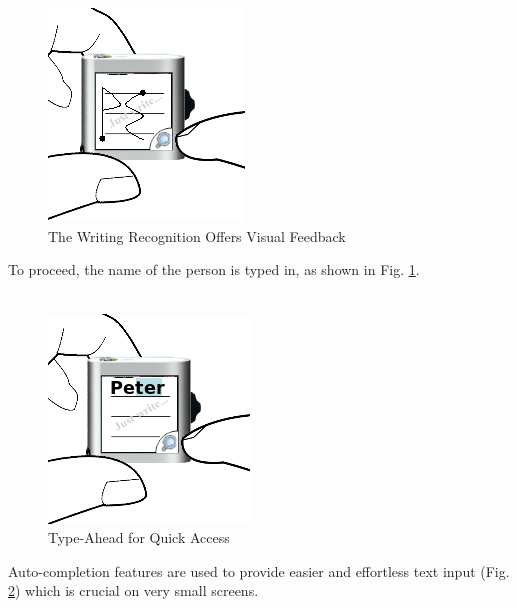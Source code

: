 \\
\\
%
\begin{figure}[h]
  \begin{center}
    \includegraphics[width=0.6\linewidth]{imgs/wt2.png}
  \end{center}
  \caption{The Writing Recognition Offers Visual Feedback}
  \label{fig:wt2}
\end{figure}
%
To proceed, the name of the person is typed in, as shown in Fig. \ref{fig:wt2}.
\\
\\
%
\begin{figure}[h]
  \begin{center}
    \includegraphics[width=0.6\linewidth]{imgs/wt3.png}
  \end{center}
  \caption{Type-Ahead for Quick Access}
  \label{fig:wt3}
\end{figure}
%
Auto-completion features are used to provide easier and effortless text input (Fig. \ref{fig:wt3}) which is crucial on very small screens.
